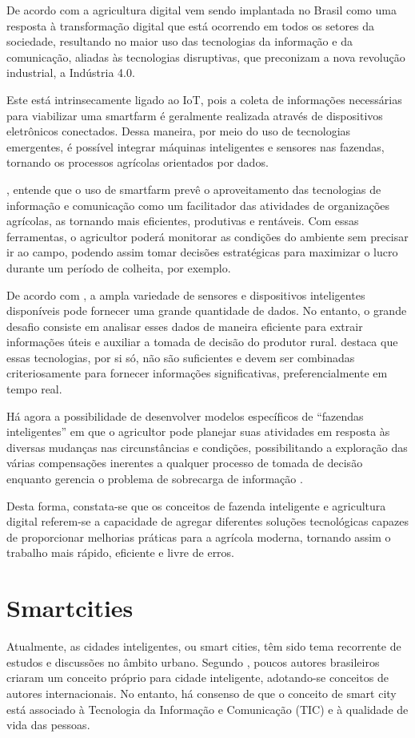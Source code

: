\documentclass[tcc,capa]{texufpel}
\begin{document}
De acordo com \citet{Masshura:2020} a agricultura digital vem sendo implantada no Brasil como uma resposta à transformação digital que está ocorrendo em todos os setores da sociedade,
resultando no maior uso das tecnologias da informação e da comunicação,
aliadas às tecnologias disruptivas, que preconizam a nova revolução industrial, a Indústria 4.0.

Este está intrinsecamente ligado ao IoT, pois a coleta de informações necessárias para viabilizar uma smartfarm é geralmente realizada através de dispositivos eletrônicos conectados. Dessa maneira, por meio do uso de tecnologias emergentes, é possível integrar máquinas inteligentes e sensores nas fazendas, tornando os processos agrícolas orientados por dados.

\citet{OGRADY:2017}, entende que o uso de smartfarm prevê o aproveitamento das tecnologias de informação  e  comunicação  como  um  facilitador das  atividades  de organizações agrícolas, as tornando mais eficientes, produtivas e rentáveis. Com essas ferramentas, o agricultor poderá monitorar as condições do ambiente sem precisar ir ao campo, podendo assim tomar decisões estratégicas para maximizar o lucro durante um período de colheita, por exemplo.

De acordo com \citet{MUSAT:2018}, a ampla variedade de sensores e dispositivos inteligentes disponíveis pode fornecer uma grande quantidade de dados. No entanto, o grande desafio consiste em analisar esses dados de maneira eficiente para extrair informações úteis e auxiliar a tomada de decisão do produtor rural. \citet{OGRADY:2017} destaca que essas tecnologias, por si só, não são suficientes e devem ser combinadas criteriosamente para fornecer informações significativas, preferencialmente em tempo real.

Há  agora  a possibilidade  de desenvolver modelos específicos de “fazendas inteligentes” em que o agricultor pode planejar suas atividades em resposta às diversas mudanças nas circunstâncias e condições, possibilitando a  exploração  das  várias  compensações  inerentes  a  qualquer  processo  de  tomada  de  decisão enquanto gerencia o problema de sobrecarga de informação \cite{OGRADY:2017}.

Desta forma, constata-se que os conceitos de fazenda inteligente e agricultura digital referem-se a capacidade de agregar diferentes soluções tecnológicas capazes de proporcionar melhorias práticas para a agrícola moderna, tornando assim o trabalho mais rápido, eficiente e livre de erros.
\section{Smartcities}
Atualmente, as cidades inteligentes, ou smart cities, têm sido tema recorrente de estudos e discussões no âmbito urbano. Segundo \citet{lazzaretti_sehnem_bencke_machado_2019}, poucos autores brasileiros criaram um conceito próprio para cidade inteligente, adotando-se conceitos de autores internacionais. No entanto, há consenso de que o conceito de smart city está associado à Tecnologia da Informação e Comunicação (TIC) e à qualidade de vida das pessoas.
\end{document}
